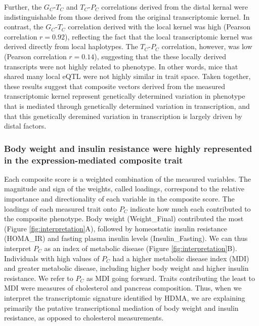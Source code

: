 \documentclass[
]{article}
\begin{document}
Further, the \(G_C\)-\(T_C\) and \(T_C\)-\(P_C\) correlations derived
from the distal kernal were indistinguishable from those derived from
the original transcriptomic kernel. In contrast, the \(G_C\)-\(T_C\)
correlation derived with the local kernel was high (Pearson correlation
\(r = 0.92\)), reflecting the fact that the local transcriptomic kernel
was derived directly from local haplotypes. The \(T_C\)-\(P_C\)
correlation, however, was low (Pearson correlation \(r = 0.14\)),
suggesting that the these locally derived transcripts were not highly
related to phenotype. In other words, mice that shared many local eQTL
were not highly similar in trait space. Taken together, these results
suggest that composite vectors derived from the measured transcriptomic
kernel represent genetically determined variation in phenotype that is
mediated through genetically determined variation in transcription, and
that this genetically deremined variation in transcription is largely
driven by distal factors.

\subsubsection{Body weight and insulin resistance were highly
represented in the expression-mediated composite
trait}\label{body-weight-and-insulin-resistance-were-highly-represented-in-the-expression-mediated-composite-trait}

Each composite score is a weighted combination of the measured
variables. The magnitude and sign of the weights, called loadings,
correspond to the relative importance and directionality of each
variable in the composite score. The loadings of each measured trait
onto \(P_C\) indicate how much each contributed to the composite
phenotype. Body weight (Weight\_Final) contributed the most (Figure
\ref{fig:interpretation}A), followed by homeostatic insulin resistance
(HOMA\_IR) and fasting plasma insulin levels (Insulin\_Fasting). We can
thus interpret \(P_C\) as an index of metabolic disease (Figure
\ref{fig:interpretation}B). Individuals with high values of \(P_C\) had
a higher metabolic disease index (MDI) and greater metabolic disease,
including higher body weight and higher insulin resistance. We refer to
\(P_C\) as MDI going forward. Traits contributing the least to MDI were
measures of cholesterol and pancreas composition. Thus, when we
interpret the transcriptomic signature identified by HDMA, we are
explaining primarily the putative transcriptional mediation of body
weight and insulin resistance, as opposed to cholesterol measurements.
\end{document}
